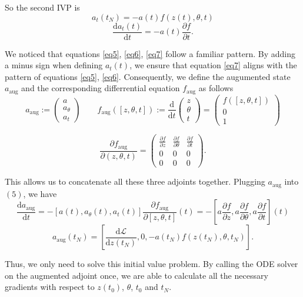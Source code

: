 \documentclass[a4paper,11pt,titlepage]{article}
\theoremstyle{definition}
\theoremstyle{plain}
\theoremstyle{remark}
\begin{document}
So the second IVP is 
$$a_t(t_N)=-a(t)f(z(t),\theta,t)$$
\begin{equation}\label{eq7}
    \frac{\mathrm{d}a_t(t)}{\mathrm{d}t} = -a(t)\frac{\partial f}{\partial t}.\tag{7}
\end{equation}

We noticed that equations \ref{eq5}, \ref{eq6}, \ref{eq7} follow a familiar pattern. By adding a minus sign when defining $a_t(t)$, we ensure that equation \ref{eq7} aligns with the pattern of equations \ref{eq5}, \ref{eq6}. Consequently, we define the augumented state $a_{\mathrm{aug}}$ and the corresponding differrential equation $f_{\mathrm{aug}}$ as follows
$$a_{\mathrm{aug}}:= \begin{pmatrix}a\\ a_\theta\\ a_t\end{pmatrix}\quad\quad f_{\mathrm{aug}}([z,\theta,t]):=\frac{\mathrm{d}}{\mathrm{d}t}\begin{pmatrix}z\\\theta\\ t\end{pmatrix}=\begin{pmatrix}f([z,\theta,t])\\0\\1\end{pmatrix}$$

\[
\frac{\partial f_{\mathrm{aug}}}{\partial (z, \theta, t)} = 
\begin{pmatrix}
\frac{\partial f}{\partial z} & \frac{\partial f}{\partial \theta} & \frac{\partial f}{\partial t} \\
0 & 0 & 0 \\
0 & 0 & 0 
\end{pmatrix}.
\]

This allows us to concatenate all these three adjoints together. Plugging $a_{\mathrm{aug}}$ into $(5)$, we have
$$
\frac{\mathrm{d}a_{\mathrm{aug}}}{\mathrm{d}t} = -[a(t), a_\theta(t), a_t(t)]\frac{\partial f_{\mathrm{aug}}}{\partial [z,\theta,t]}(t)=-\left[a\frac{\partial f}{\partial z},a\frac{\partial f}{\partial \theta},a\frac{\partial f}{\partial t}\right](t)
$$
$$
a_{\mathrm{aug}}(t_N)=\left[\frac{\mathrm{d}\mathcal{L}}{\mathrm{d}z(t_N)},0,-a(t_N)f(z(t_N),\theta, t_N)\right].
$$

Thus, we only need to solve this initial value problem. By calling the ODE solver on the augmented adjoint once, we are able to calculate all the necessary gradients with respect to $z(t_0)$, $\theta$, $t_0$ and $t_N$.
\end{document}
